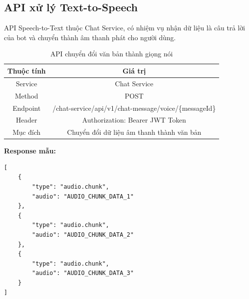 \documentclass[../DoAn.tex]{subfiles}
\begin{document}
\subsection{API xử lý Text-to-Speech}
API Speech-to-Text thuộc Chat Service, có nhiệm vụ nhận dữ liệu là câu trả lời của bot và chuyển thành âm thanh phát cho người dùng.
\begin{table}[H]
    \centering
    \renewcommand{\arraystretch}{1.8}
    \begin{tabular}{|c|c|}
        \hline
        \textbf{Thuộc tính} & \textbf{Giá trị}                                      \\
        \hline
        Service             & Chat Service                                          \\
        \hline
        Method              & POST                                                  \\
        \hline
        Endpoint            & /chat-service/api/v1/chat-message/voice/\{messageId\} \\
        \hline
        Header              & Authorization: Bearer JWT Token                       \\
        \hline
        Mục đích            & Chuyển đổi dữ liệu âm thanh thành văn bản             \\
        \hline
    \end{tabular}
    \caption{API chuyển đổi văn bản thành giọng nói}

\end{table}


\textbf{Response mẫu:}
\begin{verbatim}
[
    {
        "type": "audio.chunk",
        "audio": "AUDIO_CHUNK_DATA_1"
    },
    {
        "type": "audio.chunk",
        "audio": "AUDIO_CHUNK_DATA_2"
    },
    {
        "type": "audio.chunk",
        "audio": "AUDIO_CHUNK_DATA_3"
    }
]
\end{verbatim}

\clearpage
\end{document}
